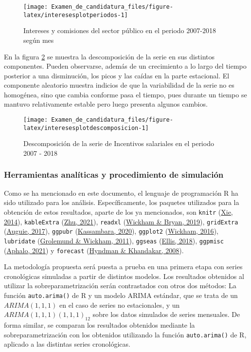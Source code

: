 \documentclass[
]{article}
\begin{document}
\begin{figure}[H]
\texttt{[image: Examen\_de\_candidatura\_files/figure-latex/interesesplotperiodos-1]} \caption{Intereses y comisiones del sector público en el periodo 2007-2018 según mes}\label{fig:interesesplotperiodos}
\end{figure}

En la figura \ref{fig:interesesplotdescomposicion} se muestra la
descomposición de la serie en sus distintos componentes. Pueden
observarse, además de un crecimiento a lo largo del tiempo posterior a
una disminución, los picos y las caídas en la parte estacional. El
componente aleatorio muestra indicios de que la variabilidad de la serie
no es homogénea, sino que cambia conforme pasa el tiempo, pues durante
un tiempo se mantuvo relativamente estable pero luego presenta algunos
cambios.

\begin{figure}[H]
\texttt{[image: Examen\_de\_candidatura\_files/figure-latex/interesesplotdescomposicion-1]} \caption{Descomposición de la serie de Incentivos salariales en el periodo 2007 - 2018}\label{fig:interesesplotdescomposicion}
\end{figure}

\subsubsection{Herramientas analíticas y procedimiento de simulación}

Como se ha mencionado en este documento, el lenguaje de programación R
ha sido utilizado para los análisis. Específicamente, los paquetes
utilizados para la obtención de estos resultados, aparte de los ya
mencionados, son \texttt{knitr} (\protect\hyperlink{ref-knitr}{Xie,
2014}), \texttt{kableExtra} (\protect\hyperlink{ref-kableExtra}{Zhu,
2021}), \texttt{readxl} (\protect\hyperlink{ref-readxl}{Wickham \&
Bryan, 2019}), \texttt{gridExtra}
(\protect\hyperlink{ref-gridExtra}{Auguie, 2017}), \texttt{ggpubr}
(\protect\hyperlink{ref-ggpubr}{Kassambara, 2020}), \texttt{ggplot2}
(\protect\hyperlink{ref-ggplot2}{Wickham, 2016}), \texttt{lubridate}
(\protect\hyperlink{ref-lubridate}{Grolemund \& Wickham, 2011}),
\texttt{ggseas} (\protect\hyperlink{ref-ggseas}{Ellis, 2018}),
\texttt{ggpmisc} (\protect\hyperlink{ref-ggpmisc}{Aphalo, 2021}) y
\texttt{forecast} (\protect\hyperlink{ref-forecast}{Hyndman \&
Khandakar, 2008}).

La metodología propuesta será puesta a prueba en una primera etapa con
series cronológicas simuladas a partir de distintos modelos. Los
resultados obtenidos al utilizar la sobreparametrización serán
contrastados con otros dos métodos: La función \texttt{auto.arima()} de
R y un modelo ARIMA estándar, que se trata de un \(ARIMA(1,1,1)\) en el
caso de series no estacionales, y un \(ARIMA(1,1,1)(1,1,1)_{12}\) sobre
los datos simulados de series mensuales. De forma similar, se comparan
los resultados obtenidos mediante la sobreparametrización con los
obtenidos utilizando la función \texttt{auto.arima()} de R, aplicado a
las distintas series cronológicas.
\end{document}
